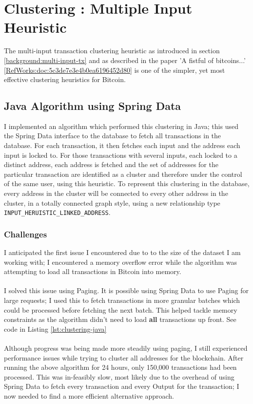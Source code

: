 \section{Clustering : Multiple Input Heuristic}

The multi-input transaction clustering heuristic as introduced in section \ref{background:multi-input-tx} and as described in the paper 'A fistful of bitcoins...' \ref{RefWorks:doc:5c3de7e3e4b0ea6196452d80} is one of the simpler, yet most effective clustering heuristics for Bitcoin. 

\subsection{Java Algorithm using Spring Data}
I implemented an algorithm which performed this clustering in Java; this used the Spring Data interface to the database to fetch all transactions in the database. For each transaction, it then fetches each input and the address each input is locked to. For those transactions with several inputs, each locked to a distinct address, each address is fetched and the set of addresses for the particular transaction are identified as a cluster and therefore under the control of the same user, using this heuristic. To represent this clustering in the database, every address in the cluster will be connected to every other address in the cluster, in a totally connected graph style, using a new relationship type \texttt{INPUT\_HERUISTIC\_LINKED\_ADDRESS}. 

\subsubsection{Challenges}

I anticipated the first issue I encountered due to to the size of the dataset I am working with; I encountered a memory overflow error while the algorithm was attempting to load all transactions in Bitcoin into memory. 
\\\\
I solved this issue using Paging. It is possible using Spring Data to use Paging for large requests; I used this to fetch transactions in more granular batches which could be processed before fetching the next batch. This helped tackle memory constraints as the algorithm didn't need to load \textbf{all} transactions up front. See code in Listing \ref{lst:clustering-java}
\\\\
Although progress was being made more steadily using paging, I still experienced performance issues while trying to cluster all addresses for the blockchain. After running the above algorithm for 24 hours, only 150,000 transactions had been processed. This was in-feasibly slow, most likely due to the overhead of using Spring Data to fetch every transaction and every Output for the transaction; I now needed to find a more efficient alternative approach. 
\\\\

